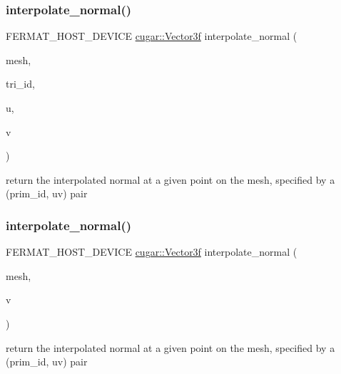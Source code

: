 \subsubsection{\texorpdfstring{interpolate\+\_\+normal()}{interpolate\_normal()}\hspace{0.1cm}{\footnotesize\ttfamily [1/2]}}
{\footnotesize\ttfamily F\+E\+R\+M\+A\+T\+\_\+\+H\+O\+S\+T\+\_\+\+D\+E\+V\+I\+CE \hyperlink{structcugar_1_1_vector}{cugar\+::\+Vector3f} interpolate\+\_\+normal (\begin{DoxyParamCaption}\item[{const \hyperlink{struct_mesh_view}{Mesh\+View} \&}]{mesh,  }\item[{const uint32}]{tri\+\_\+id,  }\item[{const float}]{u,  }\item[{const float}]{v }\end{DoxyParamCaption})\hspace{0.3cm}{\ttfamily [inline]}}

return the interpolated normal at a given point on the mesh, specified by a (prim\+\_\+id, uv) pair \mbox{\label{group___mesh_module_ga08fec3c8389f53f7493c6292d3bab80b}} 
\subsubsection{\texorpdfstring{interpolate\+\_\+normal()}{interpolate\_normal()}\hspace{0.1cm}{\footnotesize\ttfamily [2/2]}}
{\footnotesize\ttfamily F\+E\+R\+M\+A\+T\+\_\+\+H\+O\+S\+T\+\_\+\+D\+E\+V\+I\+CE \hyperlink{structcugar_1_1_vector}{cugar\+::\+Vector3f} interpolate\+\_\+normal (\begin{DoxyParamCaption}\item[{const \hyperlink{struct_mesh_view}{Mesh\+View} \&}]{mesh,  }\item[{const \hyperlink{struct_vertex_geometry_id}{Vertex\+Geometry\+Id}}]{v }\end{DoxyParamCaption})\hspace{0.3cm}{\ttfamily [inline]}}

return the interpolated normal at a given point on the mesh, specified by a (prim\+\_\+id, uv) pair \mbox{\label{group___mesh_module_ga9eea5d10bfff40b7f050910a97212189}} 
